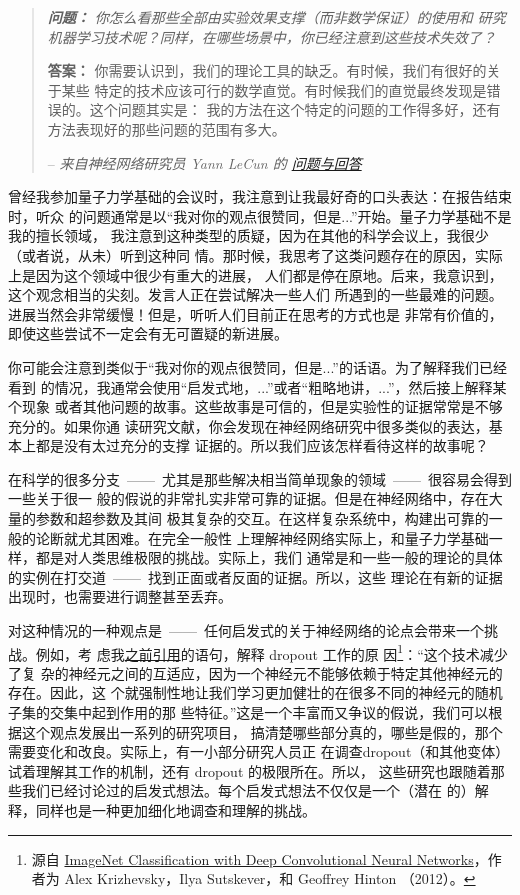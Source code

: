 \begin{quote}
{\itshape \textbf{问题：} 你怎么看那些全部由实验效果支撑（而非数学保证）的使用和
  研究机器学习技术呢？同样，在哪些场景中，你已经注意到这些技术失效了？}

\textbf{答案：} 你需要认识到，我们的理论工具的缺乏。有时候，我们有很好的关于某些
特定的技术应该可行的数学直觉。有时候我们的直觉最终发现是错误的。这个问题其实是：
我的方法在这个特定的问题的工作得多好，还有方法表现好的那些问题的范围有多大。

-- {\itshape 来自神经网络研究员 Yann LeCun 的%
  \href{http://www.reddit.com/r/MachineLearning/comments/25lnbt/ama_yann_lecun/chivdv7}{
    问题与回答}}
\end{quote}

曾经我参加量子力学基础的会议时，我注意到让我最好奇的口头表达：在报告结束时，听众
的问题通常是以“我对你的观点很赞同，但是...”开始。量子力学基础不是我的擅长领域，
我注意到这种类型的质疑，因为在其他的科学会议上，我很少（或者说，从未）听到这种同
情。那时候，我思考了这类问题存在的原因，实际上是因为这个领域中很少有重大的进展，
人们都是停在原地。后来，我意识到，这个观念相当的尖刻。发言人正在尝试解决一些人们
所遇到的一些最难的问题。进展当然会非常缓慢！但是，听听人们目前正在思考的方式也是
非常有价值的，即使这些尝试不一定会有无可置疑的新进展。

你可能会注意到类似于“我对你的观点很赞同，但是...”的话语。为了解释我们已经看到
的情况，我通常会使用“启发式地，...”或者“粗略地讲，...”，然后接上解释某个现象
或者其他问题的故事。这些故事是可信的，但是实验性的证据常常是不够充分的。如果你通
读研究文献，你会发现在神经网络研究中很多类似的表达，基本上都是没有太过充分的支撑
证据的。所以我们应该怎样看待这样的故事呢？

在科学的很多分支~——~尤其是那些解决相当简单现象的领域~——~很容易会得到一些关于很一
般的假说的非常扎实非常可靠的证据。但是在神经网络中，存在大量的参数和超参数及其间
极其复杂的交互。在这样复杂系统中，构建出可靠的一般的论断就尤其困难。在完全一般性
上理解神经网络实际上，和量子力学基础一样，都是对人类思维极限的挑战。实际上，我们
通常是和一些一般的理论的具体的实例在打交道~——~找到正面或者反面的证据。所以，这些
理论在有新的证据出现时，也需要进行调整甚至丢弃。

对这种情况的一种观点是~——~任何启发式的关于神经网络的论点会带来一个挑战。例如，考
虑我\hyperref[dropout_explanation]{之前引用}的语句，解释 dropout 工作的原
因\footnote{源自
  \href{https://papers.nips.cc/paper/4824-imagenet-classification-with-deep-convolutional-neural-networks.pdf}{ImageNet
    Classification with Deep Convolutional Neural Networks}，作者为 Alex
  Krizhevsky，Ilya Sutskever，和 Geoffrey Hinton （2012）。}：“这个技术减少了复
杂的神经元之间的互适应，因为一个神经元不能够依赖于特定其他神经元的存在。因此，这
个就强制性地让我们学习更加健壮的在很多不同的神经元的随机子集的交集中起到作用的那
些特征。”这是一个丰富而又争议的假说，我们可以根据这个观点发展出一系列的研究项目，
搞清楚哪些部分真的，哪些是假的，那个需要变化和改良。实际上，有一小部分研究人员正
在调查dropout（和其他变体）试着理解其工作的机制，还有 dropout 的极限所在。所以，
这些研究也跟随着那些我们已经讨论过的启发式想法。每个启发式想法不仅仅是一个（潜在
的）解释，同样也是一种更加细化地调查和理解的挑战。

